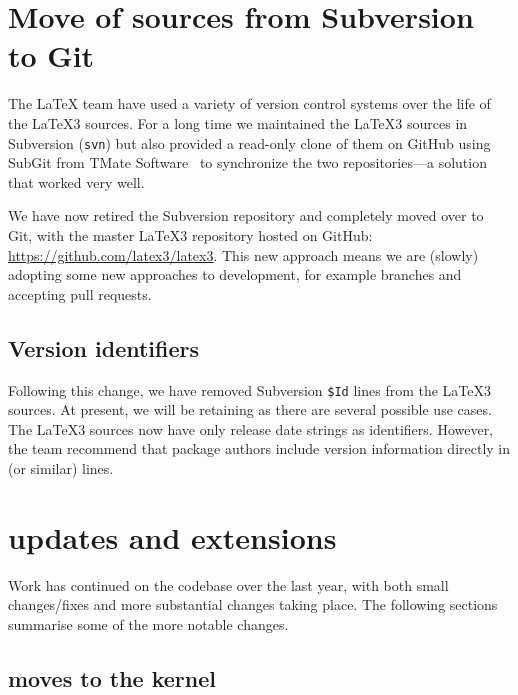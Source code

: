 \documentclass{ltnews}
\begin{document}
\maketitle

\tableofcontents

\section{Move of sources from Subversion to Git}

The \LaTeX{} team have used a variety of version control systems over the life
of the \LaTeX3 sources. For a long time we maintained the \LaTeX3 sources in
Subversion (\texttt{svn}) but also provided a read-only clone of them on GitHub using
SubGit from TMate Software~\cite{SubGit} to synchronize the two
repositories---a solution that worked very well.

We have now retired the Subversion repository and completely moved over to Git,
with the master \LaTeX3 repository hosted on GitHub:
\url{https://github.com/latex3/latex3}. This new approach means we are (slowly)
adopting some new approaches to development, for example branches and accepting
pull requests.

\subsection{Version identifiers}

Following this change, we have removed Subversion \verb=$Id= lines from the
\LaTeX3 sources. At present, we will be retaining  as there are
several possible use cases. The \LaTeX3 sources now have only release date
strings as identifiers. However, the team recommend that package authors
include version information directly in  (or similar)
lines.

\section{ updates and extensions}

Work has continued on the codebase over the last year, with both small
changes/fixes and more substantial changes taking place. The following sections
summarise some of the more notable changes.

\subsection{ moves to the kernel}
\end{document}
